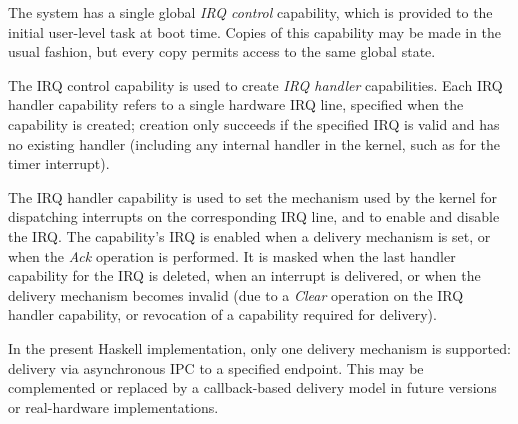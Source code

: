 The system has a single global \emph{IRQ control} capability, which is provided 
to the initial user-level task at boot time. Copies of this capability may be
made in the usual fashion, but every copy permits access to the same global
state.

The IRQ control capability is used to create \emph{IRQ handler} capabilities.
Each IRQ handler capability refers to a single hardware IRQ line, specified when 
the capability is created; creation only succeeds if the specified IRQ is valid
and has no existing handler (including any internal handler in the kernel, such
as for the timer interrupt).

The IRQ handler capability is used to set the mechanism used by the kernel for 
dispatching interrupts on the corresponding IRQ line, and to enable and disable 
the IRQ. The capability's IRQ is enabled when a delivery mechanism is set, or
when the \emph{Ack} operation is performed. It is masked when the last handler
capability for the IRQ is deleted, when an interrupt is delivered, or when the
delivery mechanism becomes invalid (due to a \emph{Clear} operation on the IRQ
handler capability, or revocation of a capability required for delivery).

In the present Haskell implementation, only one delivery mechanism is supported: 
delivery via asynchronous IPC to a specified endpoint. This may be complemented
or replaced by a callback-based delivery model in future versions or
real-hardware implementations.


